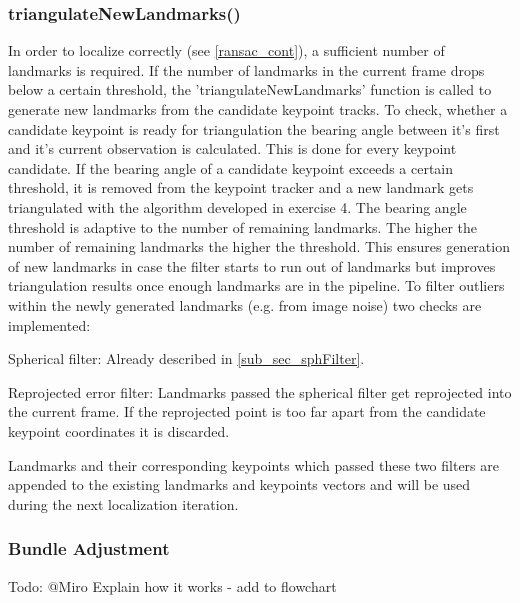 \subsubsection{triangulateNewLandmarks()} \label{triang_cont}
In order to localize correctly (see \cref{ransac_cont}), a sufficient number of landmarks is required. If the number of landmarks in the current frame drops below a certain threshold, the 'triangulateNewLandmarks' function is called to generate new landmarks from the candidate keypoint tracks. To check, whether a candidate keypoint is ready for triangulation the bearing angle between it's first and it's current observation is calculated. This is done for every keypoint candidate. If the bearing angle of a candidate keypoint exceeds a certain threshold, it is removed from the keypoint tracker and a new landmark gets triangulated with the algorithm developed in exercise 4. The bearing angle threshold is adaptive to the number of remaining landmarks. The higher the number of remaining landmarks the higher the threshold. This ensures generation of new landmarks in case the filter starts to run out of landmarks but improves triangulation results once enough landmarks are in the pipeline.
To filter outliers within the newly generated landmarks (e.g. from image noise) two checks are implemented:
\begin{compactenum}
	\item Spherical filter: Already described in \cref{sub_sec_sphFilter}.
	\item Reprojected error filter: Landmarks passed the spherical filter get reprojected into the current frame. If the reprojected point is too far apart from the candidate keypoint coordinates it is discarded.
\end{compactenum}
Landmarks and their corresponding keypoints which passed these two filters are appended to the existing landmarks and keypoints vectors and will be used during the next localization iteration.

\subsubsection{Bundle Adjustment}
Todo: @Miro
Explain how it works - add to flowchart

